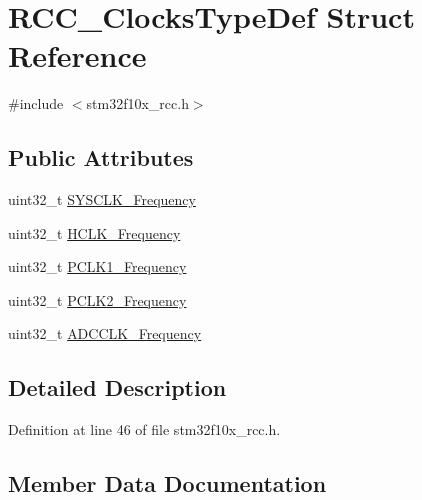 \hypertarget{struct_r_c_c___clocks_type_def}{}\section{R\+C\+C\+\_\+\+Clocks\+Type\+Def Struct Reference}
\label{struct_r_c_c___clocks_type_def}


{\ttfamily \#include $<$stm32f10x\+\_\+rcc.\+h$>$}

\subsection*{Public Attributes}
\begin{DoxyCompactItemize}
\item 
uint32\+\_\+t \hyperlink{struct_r_c_c___clocks_type_def_a2ba325067f3d464ad7955358932563d8}{S\+Y\+S\+C\+L\+K\+\_\+\+Frequency}
\item 
uint32\+\_\+t \hyperlink{struct_r_c_c___clocks_type_def_a41b9859d33954117daf7fab42f804b92}{H\+C\+L\+K\+\_\+\+Frequency}
\item 
uint32\+\_\+t \hyperlink{struct_r_c_c___clocks_type_def_add4cfc63c35178d187107edc764e0b8f}{P\+C\+L\+K1\+\_\+\+Frequency}
\item 
uint32\+\_\+t \hyperlink{struct_r_c_c___clocks_type_def_ad854f0b70a6c4cf6de6dbbdcbc99b856}{P\+C\+L\+K2\+\_\+\+Frequency}
\item 
uint32\+\_\+t \hyperlink{struct_r_c_c___clocks_type_def_aa3dad8af3bb364b6232cf5446d478e7d}{A\+D\+C\+C\+L\+K\+\_\+\+Frequency}
\end{DoxyCompactItemize}


\subsection{Detailed Description}


Definition at line 46 of file stm32f10x\+\_\+rcc.\+h.



\subsection{Member Data Documentation}
\mbox{\label{struct_r_c_c___clocks_type_def_aa3dad8af3bb364b6232cf5446d478e7d}} 
